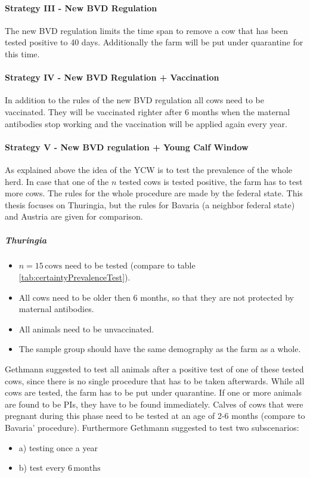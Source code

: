 \paragraph{Strategy III - New BVD Regulation}
The new BVD regulation limits the time span to remove a cow that has been tested positive to 40 days. Additionally the farm will be put under quarantine for this time. 
\paragraph{Strategy IV - New BVD Regulation + Vaccination}
In addition to the rules of the new BVD regulation all cows need to be vaccinated. They will be vaccinated righter after 6 months when the maternal antibodies stop working and the vaccination will be applied again every year. 
\paragraph{Strategy V - New BVD regulation + Young Calf Window}
As explained above the idea of the YCW is to test the prevalence of the whole herd. In case that one of the $n$ tested cows is tested positive, the farm has to test more cows. The rules for the whole procedure are made by the federal state. This thesis focuses on Thuringia, but the rules for Bavaria (a neighbor federal state) and Austria are given for comparison.
\subparagraph{Thuringia}\label{chap:stratThuringia}
\begin{itemize}
\item $n = 15\,\text{cows}$ need to be tested (compare to table \ref{tab:certaintyPrevalenceTest}).
\item All cows need to be older then 6 months, so that they are not protected by maternal antibodies.
\item All animals need to be unvaccinated.
\item The sample group should have the same demography as the farm as a whole.
\end{itemize}
Gethmann suggested to test all animals after a positive test of one of these tested cows, since there is no single procedure that has to be taken afterwards. While all cows are tested, the farm has to be put under quarantine. If one or more animals are found to be PIs, they have to be found immediately. Calves of cows that were pregnant during this phase need to be tested at an age of 2-6 months (compare to Bavaria' procedure). Furthermore Gethmann suggested to test two subscenarios:
\begin{itemize}
\item a) testing once a year
\item b) test every $6\,\text{months}$
\end{itemize}


